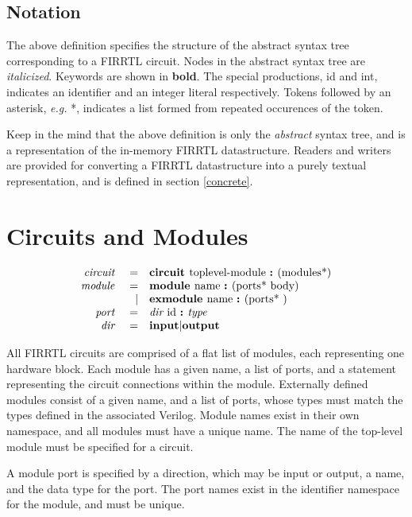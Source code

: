 \documentclass[12pt]{article}
\begin{document}
\subsection{Notation}
The above definition specifies the structure of the abstract syntax tree corresponding to a FIRRTL circuit. Nodes in the abstract syntax tree are {\em italicized}. Keywords are shown in {\bf bold}. The special productions, id and int, indicates an identifier and an integer literal respectively. Tokens followed by an asterisk, {\em e.g.} *, indicates a list formed from repeated occurences of the token.

Keep in the mind that the above definition is only the {\em abstract} syntax tree, and is a representation of the in-memory FIRRTL datastructure. Readers and writers are provided for converting a FIRRTL datastructure into a purely textual representation, and is defined in section \ref{concrete}.


\section{Circuits and Modules}
\[
\begin{array}{rrl}
\text{\em circuit\ }    &=     &\text{\bf circuit\ } \text{toplevel-module } \text{\bf :\ } (\text{modules*}) \\
\text{\em module\ }     &=     &\text{\bf module\ }  \text{name } \text{\bf :\ } (\text{ports* } \text{body}) \\
                &\vert &\text{\bf exmodule\ }  \text{name } \text{\bf :\ } (\text{ports* })           \\ 
\text{\em port\ }       &=     &\text{\em dir\ } \text{id } \text{\bf :\ } \text{\em type\ }                                 \\
\text{\em dir\ }        &=     &\text{\bf input} \vert \text{\bf output}                                \\
\end{array}
\]

All FIRRTL circuits are comprised of a flat list of modules, each representing one hardware block.
Each module has a given name, a list of ports, and a statement representing the circuit connections within the module.
Externally defined modules consist of a given name, and a list of ports, whose types must match the types defined in the associated Verilog.
Module names exist in their own namespace, and all modules must have a unique name. The name of the top-level module must be specified for a circuit.

A module port is specified by a direction, which may be input or output, a name, and the data type for the port.
The port names exist in the identifier namespace for the module, and must be unique.
\end{document}
